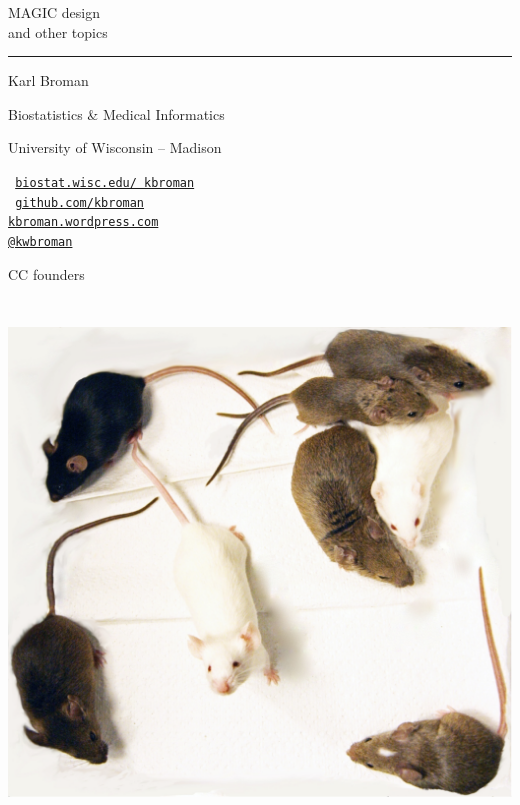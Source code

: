 \documentclass[12pt]{article}
\newcommand{\titlesize}{\fontsize{40}{50} \selectfont}
\newcommand{\headsize}{\fontsize{35}{35} \selectfont}
\newcommand{\smallsize}{\fontsize{25}{30} \selectfont}
\newcommand{\smallersize}{\fontsize{20}{25} \selectfont}
\begin{document}
\thispagestyle{empty}

\begin{center}
\titlesize \color{myyellow}

\vspace*{15mm}

{\headsize MAGIC design} \\
{\smallsize \color{myblue} and other topics}

\vspace*{5mm}

\color{mypink}
\rule{10in}{1mm}

\vspace*{20mm}

\smallsize
\color{white}
Karl Broman
\vspace{5mm}

\color{deptcolor}
{\smallersize Biostatistics \& Medical Informatics

University of Wisconsin -- Madison
\vspace{10mm}

\color{myblue}
\tt
\href{http://biostat.wisc.edu/~kbroman}{biostat.wisc.edu/~kbroman} \\
{\color{myblue} \href{http://github.com/kbroman}{github.com/kbroman} \\
\href{http://kbroman.wordpress.com}{kbroman.wordpress.com} \\
\href{http://twitter.com/kwbroman}{@kwbroman} }
}

\end{center}


\newpage


\headsize \color{myyellow}
\hfill \begin{minipage}{5.75in}
\centering
CC founders
\end{minipage}

\vfill

\centerline{\includegraphics[height=5.5in]{Figs/ccmice.png}}
\end{document}
